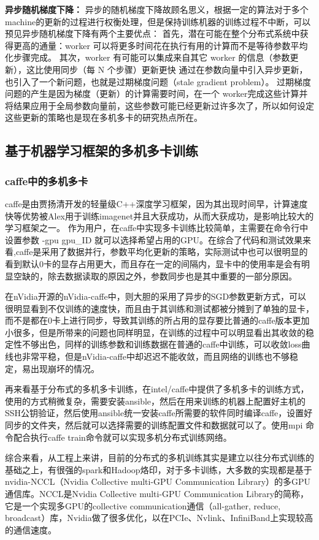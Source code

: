 \textbf{异步随机梯度下降：}
异步的随机梯度下降故顾名思义，根据一定的算法对于多个machine的更新的过程进行权衡处理，但是保持训练机器的训练过程不中断，可以预见异步随机梯度下降有两个主要优点：
首先，潜在可能在整个分布式系统中获得更高的通量：worker 可以将更多时间花在执行有用的计算而不是等待参数平均化步骤完成。
其次，worker 有可能可以集成来自其它 worker 的信息（参数更新），这比使用同步（每 N 个步骤）更新更快
通过在参数向量中引入异步更新，也引入了一个新问题，也就是过期梯度问题（stale gradient problem）。
过期梯度问题的产生是因为梯度（更新）的计算需要时间，在一个 worker完成这些计算并将结果应用于全局参数向量前，这些参数可能已经更新过许多次了，所以如何设定这些更新的策略也是现在多机多卡的研究热点所在。

\subsection{基于机器学习框架的多机多卡训练}
\subsubsection{caffe中的多机多卡}
caffe\cite{CAFFE}是由贾扬清开发的轻量级C++深度学习框架，因为其出现时间早，计算速度快等优势被Alex用于训练imagenet并且大获成功，从而大获成功，是影响比较大的学习框架之一。
作为用户，在caffe中实现多卡训练比较简单，主需要在命令行中设置参数 -gpu  gpu\_ID 就可以选择希望占用的GPU。在综合了代码和测试效果来看,caffe是采用了数据并行，参数平均化更新的策略，实际测试中也可以很明显的看到默认0卡的显存占用更大，而且存在一定的间隔内，显卡中的使用率是会有明显空缺的，除去数据读取的原因之外，参数同步也是其中重要的一部分原因。

在nVidia开源的nVidia-caffe中，则大胆的采用了异步的SGD参数更新方式，可以很明显看到不仅训练的速度快，而且由于其训练和测试都被分摊到了单独的显卡，而不是都在0卡上进行同步，导致其训练的所占用的显存要比普通的caffe版本更加小很多，但是所带来的问题也同样明显，在训练的过程中可以明显看出其收敛的稳定性不够出色，同样的训练参数和训练数据在普通的caffe中训练，可以收敛loss曲线也非常平稳，但是nVidia-caffe中却迟迟不能收敛，而且网络的训练也不够稳定，易出现崩坏的情况。

再来看基于分布式的多机多卡训练，在intel/caffe中提供了多机多卡的训练方式，使用的方式稍微复杂，需要安装ansible，然后在用来训练的机器上配置好主机的SSH公钥验证，然后使用ansible统一安装caffe所需要的软件同时编译caffe，设置好同步的文件夹，然后就可以选择需要的训练配置文件和数据就可以了。使用mpi 命令配合执行caffe train命令就可以实现多机分布式训练网络。

综合来看，从工程上来讲，目前的分布式的多机训练其实是建立以往分布式训练的基础之上，有很强的spark和Hadoop烙印，对于多卡训练，大多数的实现都是基于nvidia-NCCL（Nvidia Collective multi-GPU Communication Library）的多GPU通信库。NCCL是Nvidia Collective multi-GPU Communication Library的简称，它是一个实现多GPU的collective communication通信（all-gather, reduce, broadcast）库，Nvidia做了很多优化，以在PCIe、Nvlink、InfiniBand上实现较高的通信速度。

